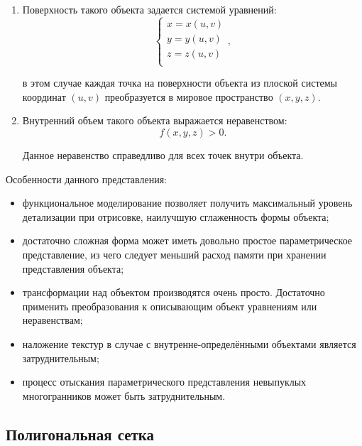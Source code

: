 \begin{enumerate}
    \item Поверхность такого объекта задается системой уравнений:
	\begin{equation}
		\left\{
		\begin{array}{l}
			x = x(u, v) \\
			y = y(u, v) \\
			z = z(u, v) \\
		\end{array}
		\right.,
	\end{equation}

    в этом случае каждая точка на поверхности объекта из плоской системы координат $(u, v)$ преобразуется в мировое пространство $(x, y, z)$.

    \item Внутренний объем такого объекта выражается неравенством:
    \begin{equation}
        f(x, y, z) > 0.
    \end{equation}
    
    Данное неравенство справедливо для всех точек внутри объекта.
\end{enumerate}

Особенности данного представления:

\begin{itemize}
    \item функциональное моделирование позволяет получить максимальный уровень детализации при отрисовке, наилучшую сглаженность формы объекта;
    \item достаточно сложная форма может иметь довольно простое параметрическое представление, из чего следует меньший расход памяти при хранении представления объекта;
    \item трансформации над объектом производятся очень просто. Достаточно применить преобразования к описывающим объект уравнениям или неравенствам;
    \item наложение текстур в случае с внутренне-определёнными объектами является затруднительным;
    \item процесс отыскания параметрического представления невыпуклых многогранников может быть затруднительным.
\end{itemize}

\subsection{Полигональная сетка}

